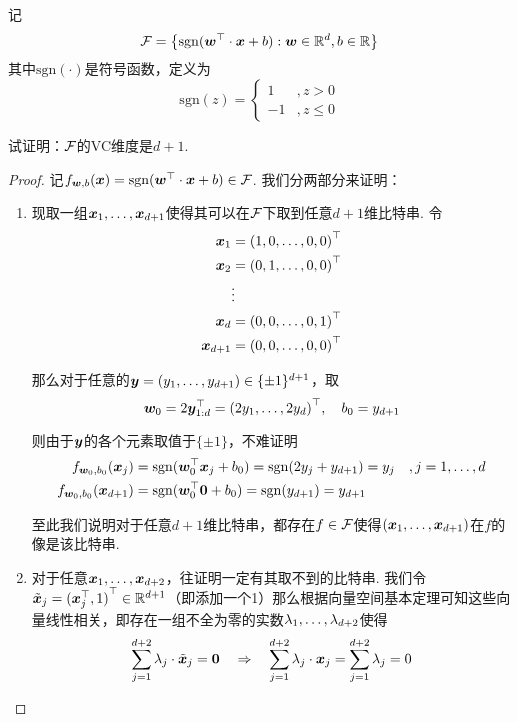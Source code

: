 
\begin{exercise}
    记 
    \[
    \mathcal{F} = \left\{
        \mathrm{sgn}(\boldsymbol{w}^{\top}\cdot \boldsymbol{x} + b): \boldsymbol{w}\in \mathbb{R}^d, b\in \mathbb{R} 
    \right\}
    \]
    其中$\mathrm{sgn}(\cdot)$是符号函数，定义为 
    \[
    \mathrm{sgn}(z) = \begin{cases}
    1 & ,z > 0\\
    -1 & ,z \le 0
    \end{cases}
    \]

    试证明：$\mathcal{F}$的VC维度是$d+1$.
\end{exercise}

\begin{proof}
记$f_{\boldsymbol{w}, b}(\boldsymbol{x}) = \mathrm{sgn}(\boldsymbol{w}^\top \cdot \boldsymbol{x} + b) \in \mathcal{F}$. 我们分两部分来证明：
\begin{enumerate}
    \item[\Circled{1}] 现取一组$\boldsymbol{x}_1, \dots, \boldsymbol{x}_{d+1}$使得其可以在$\mathcal{F}$下取到任意$d+1$维比特串. 令
    \begin{align*}
        \boldsymbol{x}_1 & = {(1, 0, \dots, 0, 0)}^\top \\
        \boldsymbol{x}_2 & = {(0, 1, \dots, 0, 0)}^\top \\
                & \vdots \\
        \boldsymbol{x}_d & = {(0, 0, \dots, 0, 1)}^\top \\
        \boldsymbol{x}_{d+1} & = {(0, 0, \dots, 0, 0)}^\top
    \end{align*}
    
    那么对于任意的$\boldsymbol{y} = (y_1, \dots, y_{d+1}) \in \{\pm 1\}^{d+1}$，取 
    \[
    \boldsymbol{w}_0 = 2\boldsymbol{y}_{1:d}^\top = {(2y_1, \dots, 2y_{d})}^\top, \quad b_0 = y_{d+1}
    \]

    则由于$\boldsymbol{y}$的各个元素取值于$\{\pm 1\}$，不难证明
    \begin{align*}
        f_{\boldsymbol{w}_0, b_0}(\boldsymbol{x}_j) & = \mathrm{sgn}(\boldsymbol{w}_0^\top \boldsymbol{x}_j+ b_0) = \mathrm{sgn}(2y_j + y_{d+1}) = y_j &, j=1,\dots,d \\
        f_{\boldsymbol{w}_0, b_0}(\boldsymbol{x}_{d+1}) & = \mathrm{sgn}(\boldsymbol{w}_0^\top \boldsymbol{0}+ b_0) = \mathrm{sgn}(y_{d+1}) = y_{d+1}
    \end{align*}
    
    至此我们说明对于任意$d+1$维比特串，都存在$f\in \mathcal{F}$使得$(\boldsymbol{x}_1, \dots, \boldsymbol{x}_{d+1})$在$f$的像是该比特串. 

    \item[\Circled{2}] 对于任意$\boldsymbol{x}_1, \dots, \boldsymbol{x}_{d+2}$，往证明一定有其取不到的比特串. 我们令$\tilde{\boldsymbol{x}}_j = {(\boldsymbol{x}_j^\top, 1)}^\top \in \mathbb{R}^{d+1}$（即添加一个1）那么根据向量空间基本定理可知这些向量线性相关，即存在一组不全为零的实数$\lambda_1, \dots, \lambda_{d+2}$使得 
    \[
    \sum_{j=1}^{d+2} \lambda_j \cdot \tilde{\boldsymbol{x}}_j = \boldsymbol{0} \quad \Rightarrow \quad \sum_{j=1}^{d+2} \lambda_j \cdot \boldsymbol{x}_j = \sum_{j=1}^{d+2} \lambda_j = 0
    \]


\end{enumerate}
\end{proof}
